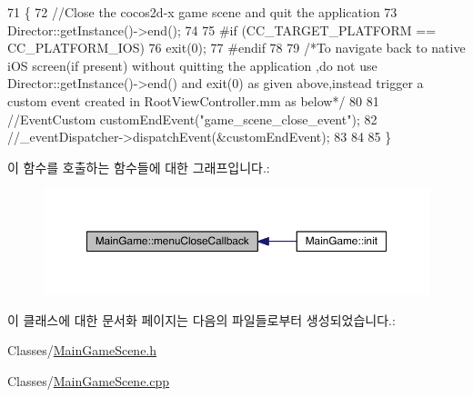 \begin{DoxyCode}
71 \{
72     \textcolor{comment}{//Close the cocos2d-x game scene and quit the application}
73     Director::getInstance()->end();
74 
75 \textcolor{preprocessor}{    #if (CC\_TARGET\_PLATFORM == CC\_PLATFORM\_IOS)}
76     exit(0);
77 \textcolor{preprocessor}{#endif}
78     
79     \textcolor{comment}{/*To navigate back to native iOS screen(if present) without quitting the application  ,do not use
       Director::getInstance()->end() and exit(0) as given above,instead trigger a custom event created in
       RootViewController.mm as below*/}
80     
81     \textcolor{comment}{//EventCustom customEndEvent("game\_scene\_close\_event");}
82     \textcolor{comment}{//\_eventDispatcher->dispatchEvent(&customEndEvent);}
83     
84     
85 \}
\end{DoxyCode}
이 함수를 호출하는 함수들에 대한 그래프입니다.\+:
\nopagebreak
\begin{figure}[H]
\begin{center}
\leavevmode
\includegraphics[width=350pt]{df/d8a/class_main_game_a824206defd2b5af2359c3699aa55e289_icgraph}
\end{center}
\end{figure}


이 클래스에 대한 문서화 페이지는 다음의 파일들로부터 생성되었습니다.\+:\begin{DoxyCompactItemize}
\item 
Classes/\hyperlink{_main_game_scene_8h}{Main\+Game\+Scene.\+h}\item 
Classes/\hyperlink{_main_game_scene_8cpp}{Main\+Game\+Scene.\+cpp}\end{DoxyCompactItemize}
